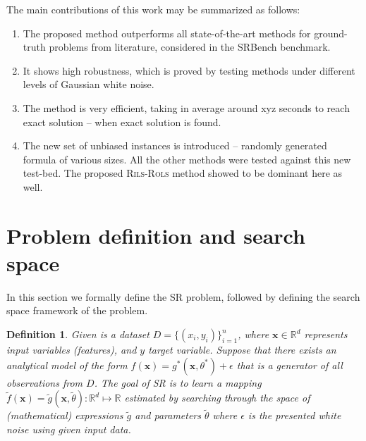 \documentclass[a4paper,12pt]{elsarticle}
\newtheorem{definition}{Definition}
\begin{document}
The main contributions of this work may be summarized as follows:

\begin{enumerate}
	\item The proposed method outperforms all state-of-the-art methods for ground-truth problems from literature, considered in the SRBench benchmark. 
	
	\item It shows high robustness, which is proved by testing methods under different levels of Gaussian white noise. 
	
	\item The method is very efficient, taking in average around xyz seconds to reach exact solution -- when exact solution is found. 
	
	\item The new set of unbiased instances is introduced -- randomly generated formula of various sizes. All the other methods were tested against this new test-bed. The proposed \textsc{Rils-Rols} method showed to be dominant here as well. 
\end{enumerate}


\section{Problem definition and search space}
\label{sec:search-space}
In this section we formally define the SR problem, followed by defining the search space framework of the problem. 

\begin{definition}
  Given is a dataset $D = \{(x_i, y_i)\}_{i=1}^n$, where $\textbf{x} \in \mathbb{R}^d$ represents input variables (features), and $y$ target variable. Suppose that there exists an analytical model of the form $f(\textbf{x})= g^*(\textbf{x}, \theta^*) + \epsilon $ that is a generator of all observations from $D$.  
   The goal of SR is to learn a mapping $\tilde{f}(\textbf{x})=  \tilde{g}(\textbf{x}, \tilde{\theta})  \colon \mathbb{R}^d \mapsto \mathbb{R}$  estimated by searching through the space of (mathematical) expressions  $\tilde{g}$ and parameters $\tilde{\theta}$ where  $\epsilon$ is the presented  white noise using given input data. 
  
\end{definition}
\end{document}
